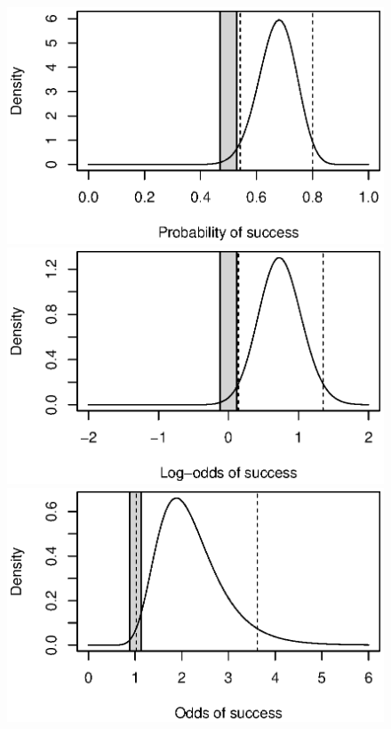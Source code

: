 \documentclass[man]{apa}
\begin{document}
\begin{figure}[!!ht]
    \centering
    \includegraphics[trim=0 15 30 40,clip,scale=.7]{p/probs.eps}\\
    \includegraphics[trim=0 15 30 40,clip,scale=.7]{p/log_odds.eps}\\
    \includegraphics[trim=0 15 30 40,clip,scale=.7]{p/odds.eps}

\end{figure}
\end{document}
